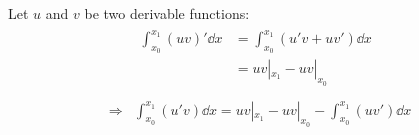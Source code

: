 Let $u$ and $v$ be two derivable functions:
\begin{equation}
\begin{split}
 & \begin{split}
        \int_{x_0}^{x_1}\left(u v\right)'\dd x & = \int_{x_0}^{x_1}\left(u' v + u v' \right)\dd x \\
                                               & = u v|_{x_1} - u v|_{x_0} \\
   \end{split}\\
\Rightarrow &
 \int_{x_0}^{x_1}\left(u' v\right) \dd x = u v|_{x_1} - u v|_{x_0} - \int_{x_0}^{x_1}\left( u v'\right) \dd x
\end{split}
\end{equation}
